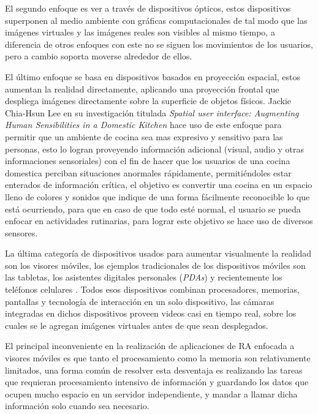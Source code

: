 \documentclass[12pt,a4paper,spanish,openany]{book}
\begin{document}
El segundo enfoque es ver a través de dispositivos ópticos, estos dispositivos
superponen al medio ambiente con gráficas computacionales de tal modo que las
imágenes virtuales y las imágenes reales son visibles al mismo
tiempo, a diferencia de otros enfoques con este no se siguen los movimientos de
los usuarios, pero a cambio soporta moverse alrededor de
ellos.\cite{Bimber:2007:MAA:1281500.1281628}

El último enfoque se basa en dispositivos basados en proyección espacial, estos
aumentan la realidad directamente, aplicando una proyección frontal que
despliega imágenes directamente sobre la superficie de objetos físicos.
Jackie Chia-Hsun Lee en su investigación titulada
\emph{Spatial user interface: Augmenting Human Sensibilities in a Domestic
Kitchen} hace uso de este enfoque para permitir que un ambiente de cocina sea
mas expresivo y sensitivo para las personas, esto lo logran  proveyendo  información
adicional (visual, audio y otras informaciones sensoriales) con el fin de hacer
que los usuarios de una cocina domestica perciban situaciones anormales
rápidamente, permitiéndoles estar enterados de información
crítica, el objetivo es convertir una cocina en un espacio lleno de colores y
sonidos que indique de una forma fácilmente reconocible lo que está
ocurriendo, para que en caso de que todo esté normal, el usuario se pueda
enfocar en actividades rutinarias, para lograr este objetivo se hace uso de
diversos sensores.


La última categoría de dispositivos usados para aumentar visualmente la realidad
son los visores móviles, los ejemplos tradicionales de los dispositivos móviles
son las tabletas, los asistentes digitales personales (\emph{PDAs}) y
recientemente los teléfonos celulares \cite{Bimber:2007:MAA:1281500.1281628}.
Todos esos dispositivos combinan procesadores, memorias, pantallas y tecnología
de interacción en un solo dispositivo, las cámaras integradas en dichos
dispositivos proveen videos casi en tiempo real, sobre los cuales se le agregan
imágenes virtuales antes de que sean desplegados.

El principal inconveniente en la realización de aplicaciones de RA enfocada a
visores móviles es que tanto el procesamiento como la memoria son relativamente
limitados, una forma común de resolver esta desventaja es realizando las tareas
que requieran procesamiento intensivo de información y guardando los datos que
ocupen mucho espacio en un servidor independiente, y mandar a llamar dicha
información solo cuando sea necesario.
\end{document}
